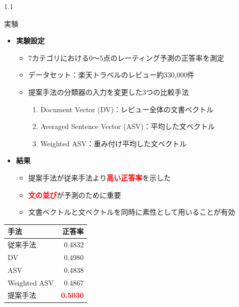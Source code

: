 \documentclass[unicode,10pt]{beamer}
\newlength{\mycolumnwidth}
\newcommand{\itemtitle}[1]{\textbf{#1}\\}
\newcommand{\fire}[1]{\textcolor{red}{\textbf{#1}}}
\newcommand{\doublecolumns}[4]{
    \begin{minipage}[t]{#1}
      #2
    \end{minipage}
    \begin{minipage}[t]{#3}
      #4
    \end{minipage}}
\begin{document}
\begin{frame}[t]
\begin{columns}[onlytextwidth,t]
  \begin{column}{1.1\mycolumnwidth}
    \begin{block}{実験}
      \begin{itemize}
        \item \itemtitle{実験設定}
          \begin{itemize}
            \item 7カテゴリにおける0〜5点のレーティング予測の正答率を測定
            \item データセット：楽天トラベルのレビュー約330,000件
            \item 提案手法の分類器の入力を変更した3つの比較手法
              \begin{enumerate}
                \item Document Vector (DV)：レビュー全体の文書ベクトル
                \item Averaged Sentence Vector (ASV)：平均した文ベクトル
                \item Weighted ASV：重み付け平均した文ベクトル
              \end{enumerate}
          \end{itemize}
      \end{itemize}

      \doublecolumns{0.6\textwidth}{
        \begin{itemize}
          \item \itemtitle{結果}
            \begin{itemize}
              \item 提案手法が従来手法より\fire{高い正答率}を示した
              \item \fire{文の並び}が予測のために重要
              \item 文書ベクトルと文ベクトルを同時に素性として用いることが有効
            \end{itemize}
        \end{itemize}
      }{0.375\textwidth}{
        \begin{table}
          \centering
          \begin{tabular}{l | r}
            手法 & 正答率 \\
            \hline
            従来手法\cite{fujitani15} & 0.4832 \\
            DV & 0.4980 \\
            ASV & 0.4838 \\
            Weighted ASV & 0.4867 \\
            提案手法 & \fire{0.5030} \\
          \end{tabular}
        \end{table}
      }
    \end{block}
  \end{column}


\end{columns}
\end{frame}
\end{document}
